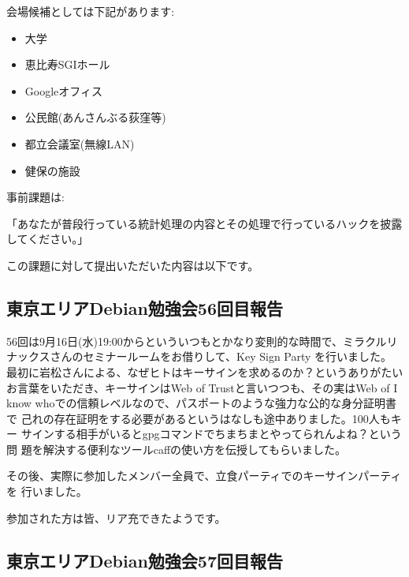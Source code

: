\documentclass[mingoth,a4paper]{jsarticle}
\begin{document}
\begin{multicols}{2}
 会場候補としては下記があります:

 \begin{itemize}
  \item 大学
  \item 恵比寿SGIホール
  \item Googleオフィス
  \item 公民館(あんさんぶる荻窪等)
  \item 都立会議室(無線LAN)
  \item 健保の施設
 \end{itemize}

\end{multicols}




事前課題は:

「あなたが普段行っている統計処理の内容とその処理で行っているハックを披露
してください。」

この課題に対して提出いただいた内容は以下です。

\begin{multicols}{2}

\end{multicols}

%
%

\subsection{東京エリアDebian勉強会56回目報告}

56回は9月16日(水)19:00からといういつもとかなり変則的な時間で、ミラクルリ
ナックスさんのセミナールームをお借りして、Key Sign Party を行いました。
最初に岩松さんによる、なぜヒトはキーサインを求めるのか？というありがたい
お言葉をいただき、キーサインはWeb of Trustと言いつつも、その実はWeb of I
know whoでの信頼レベルなので、パスポートのような強力な公的な身分証明書で
己れの存在証明をする必要があるというはなしも途中ありました。100人もキー
サインする相手がいるとgpgコマンドでちまちまとやってられんよね？という問
題を解決する便利なツールcaffの使い方を伝授してもらいました。

その後、実際に参加したメンバー全員で、立食パーティでのキーサインパーティを
行いました。

参加された方は皆、リア充できたようです。

\subsection{東京エリアDebian勉強会57回目報告}
\end{document}
